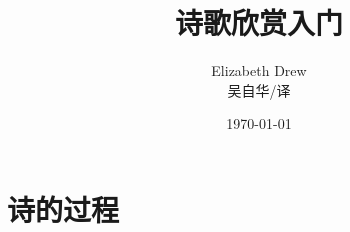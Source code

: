 \documentclass{ctexbook}
\title{诗歌欣赏入门}
\author{Elizabeth Drew\\[1ex] 
\small 吴自华/译}
\date{\today}
\begin{document}
\maketitle
\tableofcontents


\part{诗的过程}

\end{document}
